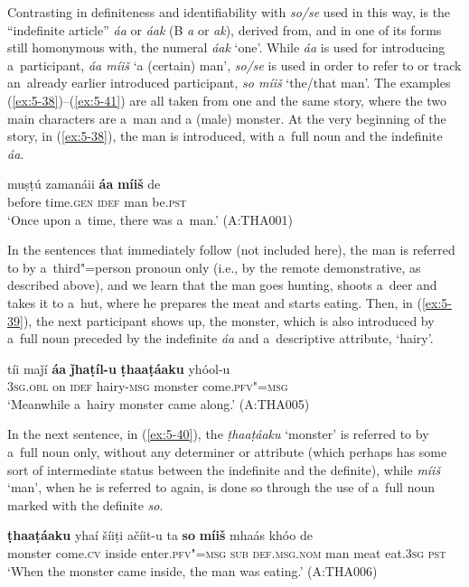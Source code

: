 Contrasting in definiteness and identifiability with \textit{so/se} used in this way, is the ``indefinite article'' \textit{áa} or \textit{áak} (B \textit{a} or \textit{ak}), derived from, and in one of its forms still homonymous with, the numeral \textit{áak} `one'. While \textit{áa} is used for introducing a~participant, \textit{áa míiš} `a (certain) man', \textit{so/se} is used in order to refer to or track an~already earlier introduced participant, \textit{so míiš} `the/that man'. The examples (\ref{ex:5-38})--(\ref{ex:5-41}) are all taken from one and the same story, where the two main characters are a~man and a (male) monster. At the very beginning of the story, in (\ref{ex:5-38}), the man is introduced, with a~full noun and the indefinite \textit{áa}.

\begin{exe}
\ex
\label{ex:5-38}
\gll muṣṭú zamanáii \textbf{áa} \textbf{míiš} de\\
before time.\textsc{gen} \textsc{idef} man be.\textsc{pst}\\
\glt `Once upon a~time, there was a~man.' (A:THA001)
\end{exe}

In the sentences that immediately follow (not included here), the man is referred to by
a~third"=person pronoun only (i.e., by the remote demonstrative, as described above), and we learn
that the man goes hunting, shoots a~deer and takes it to a~hut, where he prepares the meat and
starts eating. Then, in (\ref{ex:5-39}), the next participant shows up, the monster, which is also
introduced by a~full noun preceded by the indefinite \textit{áa} and a~descriptive attribute,
`hairy'.
\begin{exe}
\ex
\label{ex:5-39}
\gll tíi maǰí \textbf{áa} \textbf{ǰhaṭíl-u} \textbf{ṭhaaṭáaku} yhóol-u\\
\textsc{3sg.obl} on \textsc{idef} hairy-\textsc{msg} monster come.\textsc{pfv"=msg}\\
\glt `Meanwhile a~hairy monster came along.' (A:THA005)
\end{exe}

In the next sentence, in (\ref{ex:5-40}), the \textit{ṭhaaṭáaku} `monster' is referred to by a~full noun
only, without any determiner or attribute (which perhaps has some sort of intermediate status
between the indefinite and the definite), while \textit{míiš} `man', when he is referred to
again, is done so through the use of a~full noun marked with the definite \textit{so}.
\begin{exe}
\ex
\label{ex:5-40}
\gll \textbf{ṭhaaṭáaku} yhaí šíiṭi ačíit-u ta \textbf{so} \textbf{míiš} mhaás khóo de\\
monster come.\textsc{cv} inside enter.\textsc{pfv"=msg} \textsc{sub} \textsc{def.msg.nom} man meat eat.\textsc{3sg} \textsc{pst}\\
\glt `When the monster came inside, the man was eating.' (A:THA006)
\end{exe}


